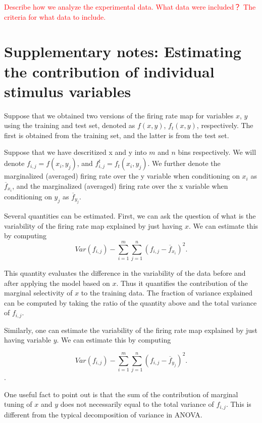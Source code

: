 \documentclass[11pt]{article}
\begin{document}
\textcolor{red}{Describe how we analyze the experimental data. What data were included？ The criteria for what data to include.} 


\newpage


\small{


}


\newpage
\section{Supplementary notes: Estimating the contribution of individual stimulus variables}

Suppose that we obtained two versions of the firing rate map for  variables $x$, $y$ using the training and test set, denoted as $f(x,y)$, $f_t(x,y)$, respectively. The first is obtained from the training set, and the latter is from the test set. 

Suppose that we have descritized x and y into $m$ and $n$ bins respectively. We will denote $f_{i,j}=f(x_i,y_j)$, and $f^{t}_{i,j}=f_t(x_i,y_j)$. We further denote the marginalized (averaged) firing rate over the y variable when conditioning on $x_i$ as $\overline{f}_{x_i}$, and the marginalized (averaged) firing rate over the x variable when conditioning on $y_j$ as $\overline{f}_{y_j}$.

Several quantities can be estimated. First, we can ask the question of what is the variability of the firing rate map explained by just having $x$. We can estimate this by computing 
$$
Var(f_{i,j})- \sum_{i=1}^m\sum_{j=1}^n (f_{i,j}-\overline{f}_{x_i})^2.
$$

This quantity evaluates the difference in the variability of the data before and after applying the model based on $x$. Thus it quantifies the contribution of the marginal selectivity of $x$ to the training data. 
The fraction of variance explained can be computed by taking the ratio of the quantity above and the total variance of $f_{i,j}$.

Similarly, one can estimate the variability of the firing rate map explained by just having variable $y$. We can estimate this by computing 

$$
Var(f_{i,j})- \sum_{i=1}^m\sum_{j=1}^n (f_{i,j}-\overline{f}_{y_j})^2.
$$. 

One useful fact to point out is that the sum of the contribution of marginal tuning of $x$ and $y$ does not necessarily equal to the total variance of $f_{i,j}$. This is different from the typical decomposition of variance in ANOVA.
\end{document}
